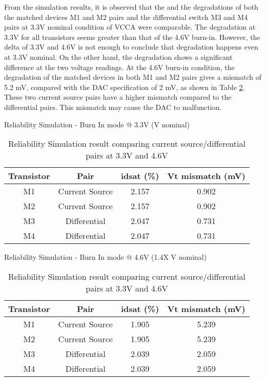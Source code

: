 \documentclass[11pt,a4paper]{article}
\begin{document}
From the simulation results, it is observed that the  and the  degradations of both the matched devices  M1 and M2 pairs and the differential switch M3 and M4 pairs at 3.3V nominal condition of VCCA were comparable. The  degradation at 3.3V for all transistors seems greater than that of the 4.6V burn-in. However, the delta of 3.3V and 4.6V is not enough to conclude that degradation happens even at 3.3V nominal. On the other hand, the  degradation shows a significant difference at the two voltage readings. At the 4.6V burn-in condition, the degradation of the matched devices  in both M1 and M2 pairs gives a  mismatch of 5.2 mV, compared with the DAC specification of 2 mV,  as shown in Table \ref{table2}. These two current source pairs have a higher  mismatch compared to the differential pairs. This mismatch may cause the DAC to malfunction. 

\begin{table}[t]
\centering
\caption{Reliability Simulation result comparing current source/differential pairs at 3.3V and 4.6V}
\label{table2}

Reliability Simulation - Burn In mode @ 3.3V (V nominal)
\begin{tabular}{|c|c|c|c|} \hline
Transistor &Pair &idsat (\%) & Vt mismatch (mV)\\
\hline
M1 & Current Source & 2.157 & 0.902\\
M2 & Current Source & 2.157 & 0.902\\
M3 & Differential & 2.047 & 0.731\\
M4 & Differential & 2.047 & 0.731\\
\hline
\end{tabular}

Reliability Simulation - Burn In mode @ 4.6V (1.4X V nominal)
\begin{tabular}{|c|c|c|c|} \hline
Transistor & Pair & idsat (\%) & Vt mismatch (mV)\\
\hline
M1 & Current Source & 1.905 & 5.239\\
M2 & Current Source & 1.905 & 5.239\\
M3 & Differential & 2.039 & 2.059\\
M4 & Differential & 2.039 & 2.059\\
\hline
\end{tabular}

\end{table}
\end{document}
